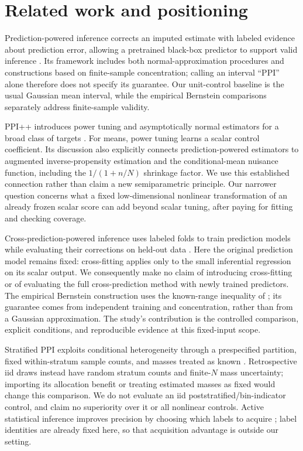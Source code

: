 \section{Related work and positioning}
Prediction-powered inference corrects an imputed estimate with labeled evidence about prediction error, allowing a pretrained black-box predictor to support valid inference \citep{angelopoulos2023ppi}. Its framework includes both normal-approximation procedures and constructions based on finite-sample concentration; calling an interval ``PPI'' alone therefore does not specify its guarantee. Our unit-control baseline is the usual Gaussian mean interval, while the empirical Bernstein comparisons separately address finite-sample validity.

PPI++ introduces power tuning and asymptotically normal estimators for a broad class of targets \citep{angelopoulos2024ppipp}. For means, power tuning learns a scalar control coefficient. Its discussion also explicitly connects prediction-powered estimators to augmented inverse-propensity estimation and the conditional-mean nuisance function, including the $1/(1+n/N)$ shrinkage factor. We use this established connection rather than claim a new semiparametric principle. Our narrower question concerns what a fixed low-dimensional nonlinear transformation of an already frozen scalar score can add beyond scalar tuning, after paying for fitting and checking coverage.

Cross-prediction-powered inference uses labeled folds to train prediction models while evaluating their corrections on held-out data \citep{zrnic2024cross}. Here the original prediction model remains fixed: cross-fitting applies only to the small inferential regression on its scalar output. We consequently make no claim of introducing cross-fitting or of evaluating the full cross-prediction method with newly trained predictors. The empirical Bernstein construction uses the known-range inequality of \citet{maurer2009empirical}; its guarantee comes from independent training and concentration, rather than from a Gaussian approximation. The study's contribution is the controlled comparison, explicit conditions, and reproducible evidence at this fixed-input scope.

Stratified PPI exploits conditional heterogeneity through a prespecified partition, fixed within-stratum sample counts, and masses treated as known \citep{fisch2024stratified}. Retrospective iid draws instead have random stratum counts and finite-$N$ mass uncertainty; importing its allocation benefit or treating estimated masses as fixed would change this comparison. We do not evaluate an iid poststratified/bin-indicator control, and claim no superiority over it or all nonlinear controls. Active statistical inference improves precision by choosing which labels to acquire \citep{zrnic2024active}; label identities are already fixed here, so that acquisition advantage is outside our setting.
